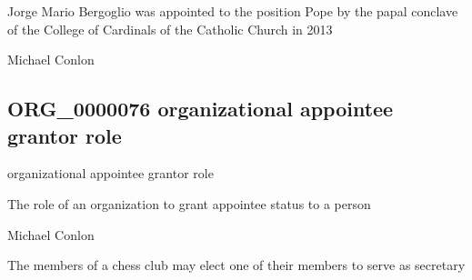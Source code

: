 \documentclass[letterpaper,10pt,english]{sphinxmanual}
\begin{document}
\begin{sphinxShadowBox}

\sphinxAtStartPar
Jorge Mario Bergoglio was appointed to the position Pope by the papal conclave of the College of Cardinals of the Catholic Church in 2013
\end{sphinxShadowBox}

\begin{sphinxShadowBox}

\sphinxAtStartPar
Michael Conlon 
\end{sphinxShadowBox}
\begin{quote}

\ignorespaces \end{quote}


\subsection{ORG\_0000076 \sphinxhyphen{} organizational appointee grantor role}
\label{\detokenize{doc-ORG_0000076:org-0000076-organizational-appointee-grantor-role}}\label{\detokenize{doc-ORG_0000076:index-0}}\label{\detokenize{doc-ORG_0000076::doc}}
\begin{sphinxShadowBox}

\sphinxAtStartPar
organizational appointee grantor role
\end{sphinxShadowBox}

\begin{sphinxShadowBox}

\sphinxAtStartPar
The role of an organization to grant appointee status to a person
\end{sphinxShadowBox}

\begin{sphinxShadowBox}

\sphinxAtStartPar
Michael Conlon 
\end{sphinxShadowBox}

\begin{sphinxShadowBox}

\sphinxAtStartPar
The members of a chess club may elect one of their members to serve as secretary
\end{sphinxShadowBox}
\end{document}
